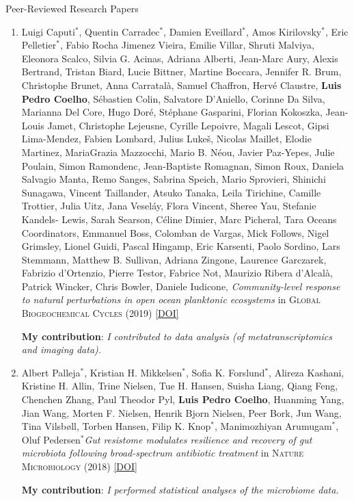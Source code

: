 \documentclass{article}
\renewcommand\subsection[1]{%
    \par\vspace{.1em}%
    {\hspace{1em}\subsubhead #1}%
    \par\vspace{.2em}%
}
\newcommand\showdoi[1]{%
    \href{http://dx.doi.org/#1}{[DOI]}%
}
\newcommand\pubname[1]{\textsc{#1}}
\newcommand\contribution[1]{\relax\hfill\break\textbf{My contribution}: \textit{#1}}
\newcommand\costar{${}^{*}$}
\begin{document}
\medskip
\medskip

\subsection{Peer-Reviewed Research Papers}
\Text

\begin{enumerate}[resume]

\item Luigi Caputi\costar, Quentin Carradec\costar, Damien Eveillard\costar,
Amos Kirilovsky\costar, Eric Pelletier\costar, Fabio Rocha Jimenez Vieira,
Emilie Villar, Shruti Malviya, Eleonora Scalco, Silvia G. Acinas, Adriana
Alberti, Jean-Marc Aury, Alexis Bertrand, Tristan Biard, Lucie Bittner, Martine
Boccara, Jennifer R. Brum, Christophe Brunet, Anna Carratalà, Samuel Chaffron,
Hervé Claustre, \textbf{Luis Pedro Coelho}, Sébastien Colin, Salvatore
D'Aniello, Corinne Da Silva, Marianna Del Core, Hugo Doré, Stéphane Gasparini,
Florian Kokoszka, Jean-Louis Jamet, Christophe Lejeusne, Cyrille Lepoivre,
Magali Lescot, Gipsi Lima-Mendez, Fabien Lombard, Julius Lukeš, Nicolas
Maillet, Elodie Martinez, MariaGrazia Mazzocchi, Mario B. Néou, Javier
Paz-Yepes, Julie Poulain, Simon Ramondenc, Jean-Baptiste Romagnan, Simon Roux,
Daniela Salvagio Manta, Remo Sanges, Sabrina Speich, Mario Sprovieri, Shinichi
Sunagawa, Vincent Taillander, Atsuko Tanaka, Leila Tirichine, Camille Trottier,
Julia Uitz, Jana Veseláy, Flora Vincent, Sheree Yau, Stefanie Kandels- Lewis,
Sarah Searson, Céline Dimier, Marc Picheral, Tara Oceans Coordinators, Emmanuel
Boss, Colomban de Vargas, Mick Follows, Nigel Grimsley, Lionel Guidi, Pascal
Hingamp, Eric Karsenti, Paolo Sordino, Lars Stemmann, Matthew B. Sullivan,
Adriana Zingone, Laurence Garczarek, Fabrizio d'Ortenzio, Pierre Testor,
Fabrice Not, Maurizio Ribera d'Alcalà, Patrick Wincker, Chris Bowler, Daniele
Iudicone, \emph{Community-level response to natural perturbations in open ocean
planktonic ecosystems} in \pubname{Global Biogeochemical Cycles} (2019)
\showdoi{10.1029/2018GB006022}
\contribution{I contributed to data analysis (of metatranscriptomics and
imaging data).}

\item Albert Palleja\costar, Kristian H. Mikkelsen\costar, Sofia K.
Forslund\costar, Alireza Kashani, Kristine H. Allin, Trine Nielsen, Tue H.
Hansen, Suisha Liang, Qiang Feng, Chenchen Zhang, Paul Theodor Pyl,
\textbf{Luis Pedro Coelho}, Huanming Yang, Jian Wang, Morten F. Nielsen, Henrik
Bjorn Nielsen, Peer Bork, Jun Wang, Tina Vilsbøll, Torben Hansen, Filip K.
Knop\costar, Manimozhiyan Arumugam\costar, Oluf Pedersen\costar \emph{Gut
resistome modulates resilience and recovery of gut microbiota following
broad-spectrum antibiotic treatment} in \pubname{Nature Microbiology} (2018)
\showdoi{10.1038/s41564-018-0257-9}
\contribution{I performed statistical analyses of the microbiome data.}


\end{enumerate}
\end{document}
